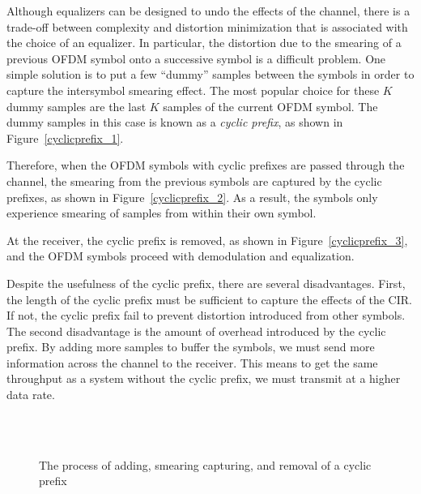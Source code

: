 \documentclass[12pt]{article}
\begin{document}
Although equalizers can be designed to undo the effects of the
channel, there is a trade-off between complexity and distortion
minimization that is associated with the choice of an equalizer.
In particular, the distortion due to the smearing of a previous
OFDM symbol onto a successive symbol is a difficult problem. One
simple solution is to put a few ``dummy'' samples between the
symbols in order to capture the intersymbol smearing effect. The
most popular choice for these $K$ dummy samples are the last $K$
samples of the current OFDM symbol. The dummy samples in this case
is known as a {\it cyclic prefix}, as shown in
Figure~\ref{cyclicprefix_1}.

Therefore, when the OFDM symbols with cyclic prefixes are passed
through the channel, the smearing from the previous symbols are
captured by the cyclic prefixes, as shown in
Figure~\ref{cyclicprefix_2}. As a result, the symbols only
experience smearing of samples from within their own symbol.

At the receiver, the cyclic prefix is removed, as shown in
Figure~\ref{cyclicprefix_3}, and the OFDM symbols proceed with
demodulation and equalization.

Despite the usefulness of the cyclic prefix, there are several
disadvantages. First, the length of the cyclic prefix must be
sufficient to capture the effects of the CIR. If not, the cyclic
prefix fail to prevent distortion introduced from other symbols.
The second disadvantage is the amount of overhead introduced by
the cyclic prefix. By adding more samples to buffer the symbols,
we must send more information across the channel to the receiver.
This means to get the same throughput as a system without the
cyclic prefix, we must transmit at a higher data rate.

\begin{figure}[h]
\begin{center}
\\
\\
\caption{The process of adding, smearing capturing, and removal of
a cyclic prefix}
\end{center}
\end{figure}
\end{document}
